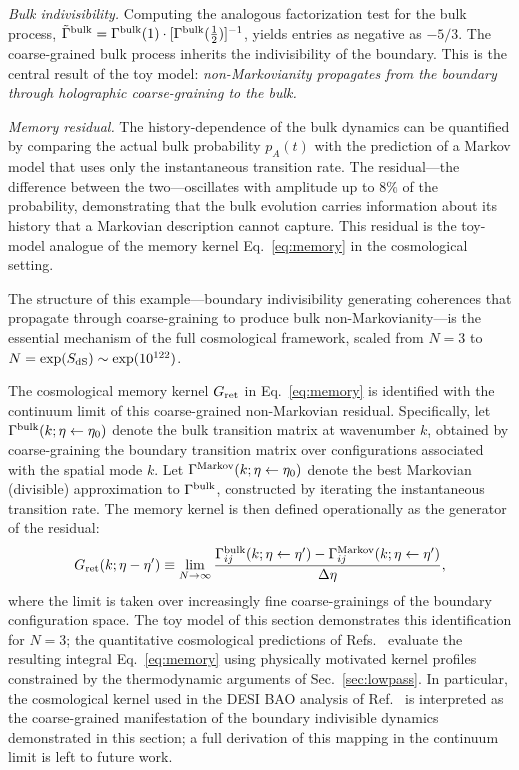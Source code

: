 \documentclass[aps,prd,twocolumn,superscriptaddress,nofootinbib]{revtex4-2}
\begin{document}
\emph{Bulk indivisibility.} Computing the analogous factorization test for the bulk process, $\tilde{\Gamma}^{\rm bulk} = \Gamma^{\rm bulk}(1) \cdot [\Gamma^{\rm bulk}(\tfrac{1}{2})]^{-1}$, yields entries as negative as $-5/3$. The coarse-grained bulk process inherits the indivisibility of the boundary. This is the central result of the toy model: \emph{non-Markovianity propagates from the boundary through holographic coarse-graining to the bulk.}

\emph{Memory residual.} The history-dependence of the bulk dynamics can be quantified by comparing the actual bulk probability $p_A(t)$ with the prediction of a Markov model that uses only the instantaneous transition rate. The residual---the difference between the two---oscillates with amplitude up to $8\%$ of the probability, demonstrating that the bulk evolution carries information about its history that a Markovian description cannot capture. This residual is the toy-model analogue of the memory kernel Eq.~\eqref{eq:memory} in the cosmological setting.

The structure of this example---boundary indivisibility generating coherences that propagate through coarse-graining to produce bulk non-Markovianity---is the essential mechanism of the full cosmological framework, scaled from $N = 3$ to $N = \exp(S_{\rm dS}) \sim \exp(10^{122})$.

The cosmological memory kernel $G_{\rm ret}$ in Eq.~\eqref{eq:memory} is identified with the continuum limit of this coarse-grained non-Markovian residual. Specifically, let $\Gamma^{\rm bulk}(k; \eta \leftarrow \eta_0)$ denote the bulk transition matrix at wavenumber $k$, obtained by coarse-graining the boundary transition matrix over configurations associated with the spatial mode $k$. Let $\Gamma^{\rm Markov}(k; \eta \leftarrow \eta_0)$ denote the best Markovian (divisible) approximation to $\Gamma^{\rm bulk}$, constructed by iterating the instantaneous transition rate. The memory kernel is then defined operationally as the generator of the residual:
\begin{equation}
G_{\rm ret}(k; \eta - \eta') \equiv \lim_{N \to \infty} \frac{\Gamma^{\rm bulk}_{ij}(k; \eta \leftarrow \eta') - \Gamma^{\rm Markov}_{ij}(k; \eta \leftarrow \eta')}{\Delta\eta},
\label{eq:kernel_bridge}
\end{equation}
where the limit is taken over increasingly fine coarse-grainings of the boundary configuration space. The toy model of this section demonstrates this identification for $N = 3$; the quantitative cosmological predictions of Refs.~\cite{PaperI,PaperVIII} evaluate the resulting integral Eq.~\eqref{eq:memory} using physically motivated kernel profiles constrained by the thermodynamic arguments of Sec.~\ref{sec:lowpass}. In particular, the cosmological kernel used in the DESI BAO analysis of Ref.~\cite{PaperVIII} is interpreted as the coarse-grained manifestation of the boundary indivisible dynamics demonstrated in this section; a full derivation of this mapping in the continuum limit is left to future work.
\end{document}
